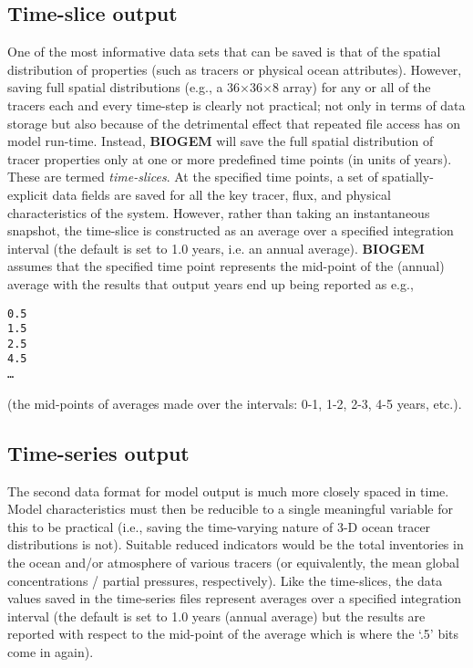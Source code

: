 \documentclass[11pt,fleqn]{book} %
\begin{document}

\subsection{Time-slice output}

One of the most informative data sets that can be saved is that of the spatial distribution of properties (such as tracers or physical ocean attributes). However, saving full spatial distributions (e.g., a 36\(\times\)36\(\times\)8 array) for any or all of the tracers each and every time-step is clearly not practical; not only in terms of data storage but also because of the detrimental effect that repeated file access has on model run-time.
Instead, \textbf{BIOGEM} will save the full spatial distribution of tracer properties only at one or more predefined time points (in units of years). These are termed \textit{time-slices}. At the specified time points, a set of spatially-explicit data fields are saved for all the key tracer, flux, and physical characteristics of the system. However, rather than taking an instantaneous snapshot, the time-slice is constructed as an average over a specified integration interval (the default is set to 1.0 years, i.e. an annual average). \textbf{BIOGEM}  assumes that the specified time point represents the mid-point of the (annual) average with the results that output years end up being reported as e.g.,
\begin{verbatim}
0.5
1.5
2.5
4.5
…
\end{verbatim}
(the mid-points of averages made over the intervals: 0-1, 1-2, 2-3, 4-5 years, etc.).


\subsection{Time-series output}

The second data format for model output is much more closely spaced in time. Model characteristics must then be reducible to a single meaningful variable for this to be practical (i.e., saving the time-varying nature of 3-D ocean tracer distributions is not). Suitable reduced indicators would be the total inventories in the ocean and/or atmosphere of various tracers (or equivalently, the mean global concentrations / partial pressures, respectively). Like the time-slices, the data values saved in the time-series files represent averages over a specified integration interval (the default is set to 1.0 years (annual average) but the results are reported with respect to the mid-point of the average which is where the ‘.5’ bits come in again).
\end{document}
